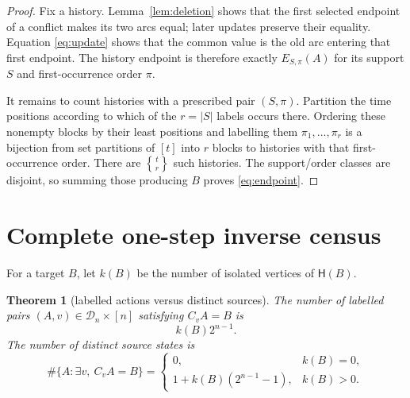 \documentclass[a4paper,10pt]{amsart}
\newtheorem{theorem}{Theorem}[section]
\theoremstyle{remark}
\newcommand{\Dn}{\mathcal D_n}
\newcommand{\Conf}{\mathsf H}
\newcommand{\Stir}[2]{\genfrac\{\}{0pt}{}{#1}{#2}}
\begin{document}
\begin{proof}
Fix a history.  Lemma~\ref{lem:deletion} shows that the first selected
endpoint of a conflict makes its two arcs equal; later updates preserve their
equality.  Equation \eqref{eq:update} shows that the common value is the old
arc entering that first endpoint.  The history endpoint is therefore exactly
$E_{S,\pi}(A)$ for its support $S$ and first-occurrence order $\pi$.

It remains to count histories with a prescribed pair $(S,\pi)$.  Partition
the time positions according to which of the $r=|S|$ labels occurs there.
Ordering these nonempty blocks by their least positions and labelling them
$\pi_1,\ldots,\pi_r$ is a bijection from set partitions of $[t]$ into $r$
blocks to histories with that first-occurrence order.  There are
$\Stir{t}{r}$ such histories.  The support/order classes are disjoint, so
summing those producing $B$ proves \eqref{eq:endpoint}.
\end{proof}

\section{Complete one-step inverse census}

For a target $B$, let $k(B)$ be the number of isolated vertices of
$\Conf(B)$.

\begin{theorem}[labelled actions versus distinct sources]\label{thm:fibres}
The number of labelled pairs $(A,v)\in\Dn\times[n]$ satisfying $C_vA=B$ is
\begin{equation}\label{eq:labelled-fibre}
 k(B)2^{n-1}.
\end{equation}
The number of distinct source states is
\begin{equation}\label{eq:distinct-fibre}
 \#\{A:\exists v,\ C_vA=B\}=
 \begin{cases}
 0,&k(B)=0,\\
 1+k(B)(2^{n-1}-1),&k(B)>0.
 \end{cases}
\end{equation}
\end{theorem}
\end{document}
